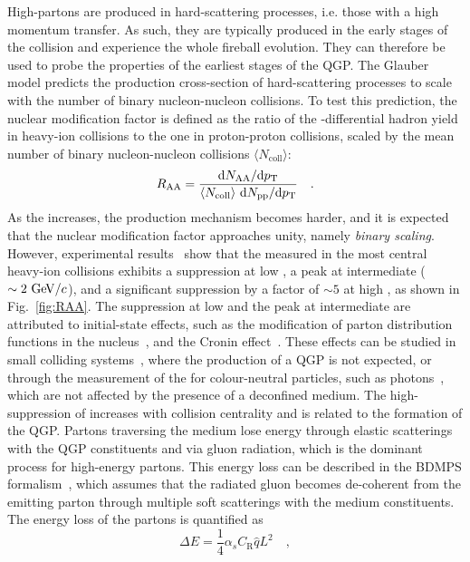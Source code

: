 High-\pt partons are produced in hard-scattering processes, i.e. those with a high momentum transfer. As such, they are typically produced in the early stages of the collision and experience the whole fireball evolution. They can therefore be used to probe the properties of the earliest stages of the QGP. The Glauber model predicts the production cross-section of hard-scattering processes to scale with the number of binary nucleon-nucleon collisions. To test this prediction, the nuclear modification factor \raa is defined as the ratio of the \pt-differential hadron yield in heavy-ion collisions to the one in proton-proton collisions, scaled by the mean number of binary nucleon-nucleon collisions $\langle N_\mathrm{coll} \rangle$:
\begin{equation*}
    R_\mathrm{AA} = \frac{\mathrm{d} N_\mathrm{AA}/\mathrm{d}p\mathrm{_T}}{\langle N_\mathrm{coll} \rangle~\mathrm{d} N_\mathrm{pp}/\mathrm{d}p\mathrm{_T}}\quad .
\end{equation*}
As the \pt increases, the production mechanism becomes harder, and it is expected that the nuclear modification factor approaches unity, namely \emph{binary scaling}. However, experimental results~\cite{ALICE:2018vuu} show that the \raa measured in the most central heavy-ion collisions exhibits a suppression at low \pt, a peak at intermediate \pt ($\sim 2~\mathrm{Ge\kern-.1emV}/c$), and a significant suppression by a factor of $\sim5$ at high \pt, as shown in Fig.~\ref{fig:RAA}. The suppression at low \pt and the peak at intermediate \pt are attributed to initial-state effects, such as the modification of parton distribution functions in the nucleus~\cite{Arneodo:1992wf}, and the Cronin effect~\cite{Kopeliovich:2002yh}. These effects can be studied in small colliding systems~\cite{PHENIX:2021dod}, where the production of a QGP is not expected, or through the measurement of the \raa for colour-neutral particles, such as photons~\cite{PHENIX:2012jbv}, which are not affected by the presence of a deconfined medium. The high-\pt suppression of \raa increases with collision centrality and is related to the formation of the QGP. Partons traversing the medium lose energy through elastic scatterings with the QGP constituents and via gluon radiation, which is the dominant process for high-energy partons. This energy loss can be described in the BDMPS formalism~\cite{Baier:1996kr}, which assumes that the radiated gluon becomes de-coherent from the emitting parton through multiple soft scatterings with the medium constituents. The energy loss of the partons is quantified as
\begin{equation*}
    \Delta E = \frac{1}{4}\alpha_s C_\mathrm{R}\hat{q}L^2\quad ,
\end{equation*}
